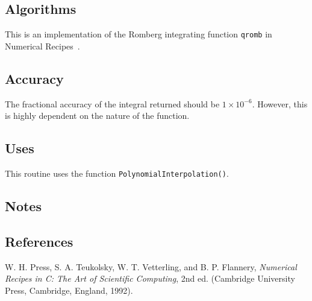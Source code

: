 \documentclass{article}
\begin{document}
\subsection{Algorithms}

This is an implementation of the Romberg integrating function \verb+qromb+ in
Numerical Recipes~\cite{ptvf:1992}.

\subsection{Accuracy}

The fractional accuracy of the integral returned should be $1\times10^{-6}$.
However, this is highly dependent on the nature of the function.

\subsection{Uses}

This routine uses the function \verb+PolynomialInterpolation()+.

\subsection{Notes}

\subsection{References}
\begin{thebibliography}{0}
  W. H. Press, S. A. Teukolsky, W. T. Vetterling, and B. P. Flannery,
  \textit{Numerical Recipes in C: The Art of Scientific Computing}, 2nd ed.
  (Cambridge University Press, Cambridge, England, 1992).
\end{thebibliography}
\end{document}
